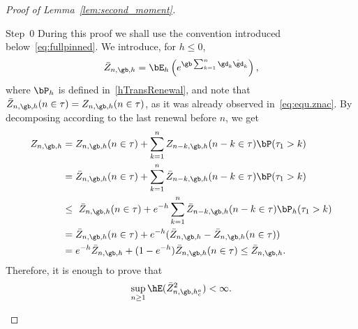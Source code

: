 \begin{proof}[Proof of Lemma~\ref{lem:second_moment}]
\begin{step}{Step~0}
During this proof we shall use the convention introduced below~\eqref{eq:fullpinned}. We introduce, for $h \leq 0$,
\begin{equation}
\bar Z_{n,\gb,h} = \bE_h\left(e^{\gb \sum_{k=1}^n \gd_k \hat \gd_k} \right),
\end{equation}
where $\bP_h$ is defined in~\eqref{hTransRenewal}, and note that $\bar Z_{n,\gb,h}(n\in\tau) = Z_{n,\gb,h}(n\in\tau)$, as it was already observed in~\eqref{eq:equ.znac}. By decomposing according to the last renewal before $n$, we get
\begin{equation}
\begin{aligned}
Z_{n,\gb,h} &= Z_{n,\gb,h}(n\in\tau) + \sum_{k=1}^n Z_{n-k,\gb,h}(n-k\in\tau) \bP(\tau_1 > k)\\
&= \bar Z_{n,\gb,h}(n\in\tau) + \sum_{k=1}^n \bar Z_{n-k,\gb,h}(n-k\in\tau) \bP(\tau_1 > k)\\
& \leq\ \bar Z_{n,\gb,h}(n\in\tau) + e^{- h} \sum_{k=1}^n \bar Z_{n-k,\gb,h}(n-k\in\tau) \bP_h(\tau_1 > k)\\
&= \bar Z_{n,\gb,h}(n\in\tau) + e^{- h} (\bar Z_{n,\gb,h} - \bar Z_{n,\gb,h}(n\in\tau))\\
&= e^{- h} \bar Z_{n,\gb,h} + (1 - e^{- h}) \bar Z_{n,\gb,h}(n\in\tau) \leq \bar Z_{n,\gb,h}.
\end{aligned}
\end{equation}
Therefore, it is enough to prove that
\begin{equation}
\sup_{n\geq1} \hE(\bar Z_{n,\gb,h_c^a}^2) < \infty.
\end{equation}
\end{step}


\end{proof}
